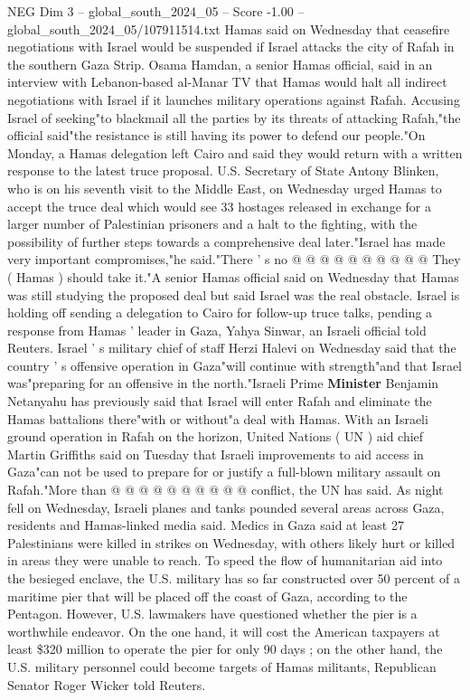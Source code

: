 \begin{textsample}{NEG Dim 3 – global\_south\_2024\_05 – Score -1.00 – global\_south\_2024\_05/107911514.txt}  \label{ex:f3_neg_361}
Hamas said on Wednesday that ceasefire negotiations with Israel would be suspended if Israel attacks the city of Rafah in the southern Gaza Strip.
Osama Hamdan, a senior Hamas official, said in an interview with Lebanon-based al-Manar TV that Hamas would halt all indirect negotiations with Israel if it launches military operations against Rafah.
Accusing Israel of seeking"to blackmail all the parties by its threats of attacking Rafah,"the official said"the resistance is still having its power to defend our people."On Monday, a Hamas delegation left Cairo and said they would return with a written response to the latest truce proposal.
U.S.
Secretary of State Antony Blinken, who is on his seventh visit to the Middle East, on Wednesday urged Hamas to accept the truce deal which would see 33 hostages released in exchange for a larger number of Palestinian prisoners and a halt to the fighting, with the possibility of further steps towards a comprehensive deal later."Israel has made very important compromises,"he said."There ' s no @ @ @ @ @ @ @ @ @ @ They ( Hamas ) should take it."A senior Hamas official said on Wednesday that Hamas was still studying the proposed deal but said Israel was the real obstacle.
Israel is holding off sending a delegation to Cairo for follow-up truce talks, pending a response from Hamas ' leader in Gaza, Yahya Sinwar, an Israeli official told Reuters.
Israel ' s military chief of staff Herzi Halevi on Wednesday said that the country ' s offensive operation in Gaza"will continue with strength"and that Israel was"preparing for an offensive in the north."Israeli Prime \textbf{Minister} Benjamin Netanyahu has previously said that Israel will enter Rafah and eliminate the Hamas battalions there"with or without"a deal with Hamas.
With an Israeli ground operation in Rafah on the horizon, United Nations ( UN ) aid chief Martin Griffiths said on Tuesday that Israeli improvements to aid access in Gaza"can not be used to prepare for or justify a full-blown military assault on Rafah."More than @ @ @ @ @ @ @ @ @ @ conflict, the UN has said.
As night fell on Wednesday, Israeli planes and tanks pounded several areas across Gaza, residents and Hamas-linked media said.
Medics in Gaza said at least 27 Palestinians were killed in strikes on Wednesday, with others likely hurt or killed in areas they were unable to reach.
To speed the flow of humanitarian aid into the besieged enclave, the U.S. military has so far constructed over 50 percent of a maritime pier that will be placed off the coast of Gaza, according to the Pentagon.
However, U.S. lawmakers have questioned whether the pier is a worthwhile endeavor.
On the one hand, it will cost the American taxpayers at least \$320 million to operate the pier for only 90 days ; on the other hand, the U.S. military personnel could become targets of Hamas militants, Republican Senator Roger Wicker told Reuters.

\end{textsample}
